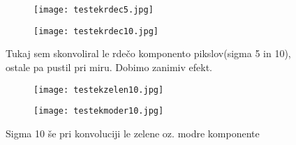 \documentclass{article}
\begin{document}
\begin{figure}[H]
\centering
\begin{subfigure}{.49\textwidth}
\texttt{[image: testekrdec5.jpg]}
\end{subfigure}
\begin{subfigure}{.49\textwidth}
\texttt{[image: testekrdec10.jpg]}
\end{subfigure}
\caption*{Tukaj sem skonvoliral le rdečo komponento pikslov(sigma 5 in 10), ostale pa pustil pri miru. Dobimo zanimiv efekt. }
\end{figure}

\begin{figure}[H]
\centering
\begin{subfigure}{.49\textwidth}
\texttt{[image: testekzelen10.jpg]}
\end{subfigure}
\begin{subfigure}{.49\textwidth}
\texttt{[image: testekmoder10.jpg]}
\end{subfigure}
\caption*{Sigma 10 še pri konvoluciji le zelene oz. modre komponente }
\end{figure}
\end{document}
